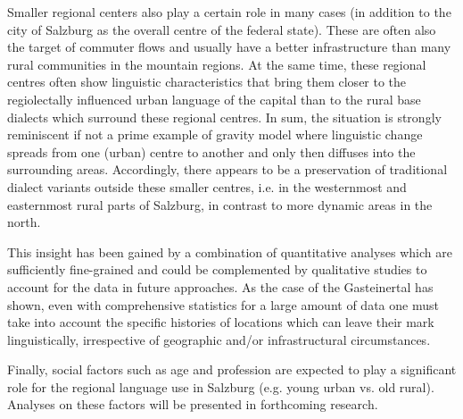 \documentclass[output=paper,colorlinks, citecolor=brown]{langscibook}
\begin{document}
Smaller regional centers also play a certain role in many cases (in addition to the city of Salzburg as the overall centre of the federal state). These are often also the target of commuter flows and usually have a better infrastructure than many rural communities in the mountain regions. At the same time, these regional centres often show linguistic characteristics that bring them closer to the regiolectally influenced urban language of the capital than to the rural base dialects which surround these regional centres. In sum, the situation is strongly reminiscent if not a prime example of  gravity model where linguistic change spreads from one (urban) centre to another and only then diffuses into the surrounding areas. Accordingly, there appears to be a preservation of traditional dialect variants outside these smaller centres, i.e. in the westernmost and easternmost rural parts of Salzburg, in contrast to more dynamic areas in the north.
\largerpage[2]

This insight has been gained by a combination of quantitative analyses which are sufficiently fine-grained and could be complemented by qualitative studies to account for the data in future approaches. As the case of the Gasteinertal has shown, even with comprehensive statistics for a large amount of data one must take into account the specific histories of locations which can leave their mark linguistically, irrespective of geographic and/or infrastructural circumstances. 

Finally, social factors such as age  and profession are expected to play a significant role for the regional language use in Salzburg (e.g. young urban vs. old rural). Analyses on these factors will be presented in forthcoming research.

\sloppy\printbibliography[heading=subbibliography,notkeyword=this]
\end{document}
